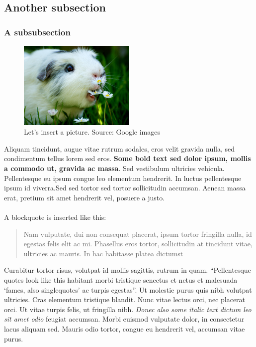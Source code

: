 \documentclass[12pt,a4paper]{article}
\begin{document}
\subsection{Another subsection}
\label{sec:1-2}

\subsubsection{A subsubsection}
\begin{figure}[h!]
\noindent 
  \centering
  \includegraphics[width=0.5\textwidth]{omnom.jpg}
  \caption{Let's insert a picture. Source: Google images} 
\end{figure}
\noindent
Aliquam tincidunt, augue vitae rutrum sodales, eros velit gravida
nulla, sed condimentum tellus lorem sed eros. \textbf{Some bold text
  sed dolor ipsum, mollis a commodo ut, gravida ac massa}. Sed
vestibulum ultricies vehicula. Pellentesque eu ipsum congue leo
elementum hendrerit. In luctus pellentesque ipsum id viverra.Sed sed
tortor sed tortor sollicitudin accumsan. Aenean massa erat, pretium
sit amet hendrerit vel, posuere a justo.\\\\A blockquote is inserted
like this:
\singlespacing
\begin{quote}
  Nam vulputate, dui non consequat placerat, ipsum tortor fringilla
  nulla, id egestas felis elit ac mi. Phasellus eros tortor,
  sollicitudin at tincidunt vitae, ultricies ac mauris. In hac
  habitasse platea dictumst \cite[p.\ 1350]{TwoAuthors2010}
\end{quote}
\onehalfspacing
\noindent
Curabitur tortor risus, volutpat id mollis sagittis, rutrum in
quam. ``Pellentesque quotes look like this habitant morbi tristique
senectus et netus et malesuada `fames, also singlequotes' ac turpis
egestas''. Ut molestie purus quis nibh volutpat ultricies. Cras
elementum tristique blandit. Nunc vitae lectus orci, nec placerat
orci. Ut vitae turpis felis, ut fringilla nibh. \textit{Donec also
  some italic text dictum leo sit amet odio} feugiat accumsan. Morbi
euismod vulputate dolor, in consectetur lacus aliquam sed. Mauris odio
tortor, congue eu hendrerit vel, accumsan vitae purus.
\end{document}
